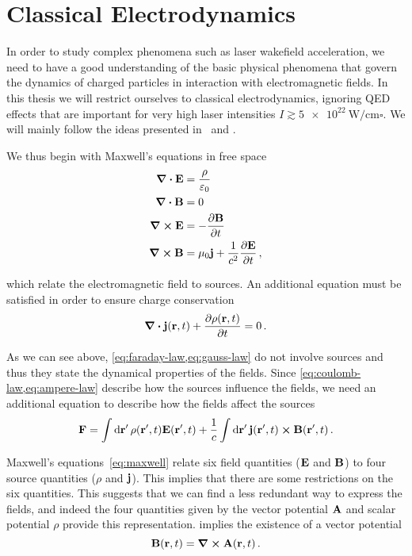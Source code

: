 \documentclass[12pt, class=report, crop=false]{standalone}
\begin{document}
\chapter{Classical Electrodynamics}%
\label{chap:physics}

In order to study complex phenomena such as laser wakefield acceleration,
we need to have a good understanding of the basic physical phenomena
that govern the dynamics of charged particles in interaction
with electromagnetic fields. In this thesis we will restrict ourselves to
classical electrodynamics, ignoring QED effects that are important
for very high laser intensities \(I \gtrsim \SI{5e22}{\watt/\centi\metre\square}\).
We will mainly follow the ideas presented in~\textcite{jackson_classicalelectrodynamics_1999}
and \textcite[Chapter 2]{eisenberg_nucleartheory_1978}.

We thus begin with Maxwell's equations in free space
\begin{subequations}%
  \label{eq:maxwell}
  \begin{align}
    \div{\vb{E}} & = \frac{\rho}{\varepsilon_0} \label{eq:coulomb-law} \\
    \div{\vb{B}} & = 0 \label{eq:gauss-law} \\
    \curl{\vb{E}} & = - \pdv{\vb{B}}{t} \label{eq:faraday-law} \\
    \curl{\vb{B}} & = \mu_0 \vb{j} + \frac{1}{c^2} \pdv{\vb{E}}{t} \,, \label{eq:ampere-law}
  \end{align}
\end{subequations}

which relate the electromagnetic field to sources. An additional
equation must be satisfied in order to ensure charge conservation
\begin{equation}
  \label{eq:continuity-equation}
  \div{\vb{j}(\vb{r}, t)} + \pdv{\rho(\vb{r}, t)}{t} = 0 \,.
\end{equation}

As we can see above, \cref{eq:faraday-law,eq:gauss-law}
do not involve sources and thus they state the dynamical properties of the fields.
Since \cref{eq:coulomb-law,eq:ampere-law} describe how
the sources influence the fields, we need an additional equation to describe how
the fields affect the sources
\[
  \vb{F} = \int \dd{\vb{r}'} \rho(\vb{r}', t) \vb{E}(\vb{r}', t) +
           \frac{1}{c} \int \dd{\vb{r}'} \vb{j}(\vb{r}', t) \cross \vb{B}(\vb{r}', t)\,.
\]

Maxwell's equations~\eqref{eq:maxwell} relate six field quantities (\(\vb{E}\) and \(\vb{B}\))
to four source quantities (\(\rho\) and \(\vb{j}\)). This implies that there are some
restrictions on the six quantities. This suggests that we can find a less redundant
way to express the fields, and indeed the four quantities given by the
vector potential \(\vb{A}\) and scalar potential \(\rho\) provide this representation.
 implies the existence of a vector potential
\begin{equation}
  \label{eq:vector-potential}
  \vb{B}(\vb{r}, t) = \curl{\vb{A}(\vb{r}, t)}\,.
\end{equation}
\end{document}
